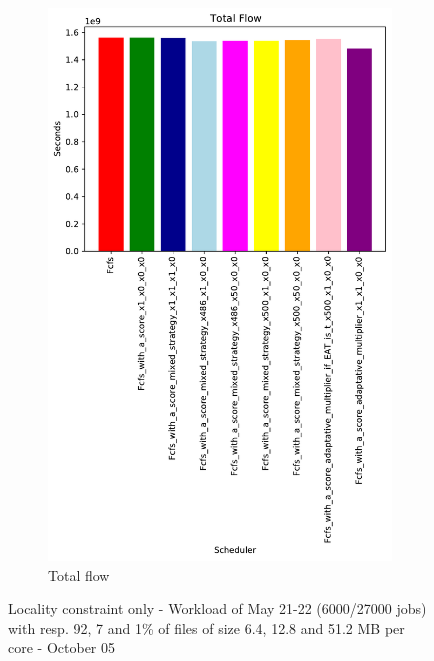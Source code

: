 \documentclass[a4paper]{article}
\begin{document}
\begin{figure}[H]
\begin{subfigure}[b]{0.4\linewidth}\centering\includegraphics[width=0.9\linewidth]{MBSS/plot/Results_FCFS_Score_Adaptative_Multiplier_2022-05-21->2022-05-22_V9271_Total_flow_450_128_32_256_4_1024.pdf}\caption{Total flow}\end{subfigure}
\caption{Locality constraint only - Workload of May 21-22 (6000/27000 jobs) with resp. 92, 7 and 1\% of files of size 6.4, 12.8 and 51.2 MB per core - October 05}\end{figure}
\end{document}
